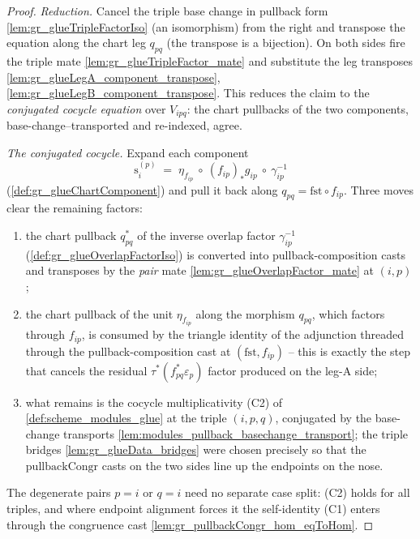 \begin{proof}
    \leanok
  \emph{Reduction.} Cancel the triple base change in pullback form
  \cref{lem:gr_glueTripleFactorIso} (an isomorphism) from the right and transpose the
  equation along the chart leg \(q_{pq}\) (the transpose is a bijection). On both sides
  fire the triple mate \cref{lem:gr_glueTripleFactor_mate} and substitute the leg
  transposes \cref{lem:gr_glueLegA_component_transpose},
  \cref{lem:gr_glueLegB_component_transpose}. This reduces the claim to the
  \emph{conjugated cocycle equation} over \(V_{ipq}\): the chart pullbacks of the two
  components, base-change--transported and re-indexed, agree.

  \emph{The conjugated cocycle.} Expand each component
  \[
    \mathrm{s}_i^{(p)}
      \;=\; \eta_{f_{ip}}\ \circ\ (f_{ip})_{*}g_{ip}\ \circ\ \gamma_{ip}^{-1}
  \]
  (\cref{def:gr_glueChartComponent}) and pull it back along \(q_{pq} = \mathrm{fst}\circ
  f_{ip}\). Three moves clear the remaining factors:
  \begin{enumerate}
    \item the chart pullback \(q_{pq}^{*}\) of the inverse overlap factor
      \(\gamma_{ip}^{-1}\) (\cref{def:gr_glueOverlapFactorIso}) is converted into
      pullback-composition casts and transposes by the \emph{pair} mate
      \cref{lem:gr_glueOverlapFactor_mate} at \((i,p)\);
    \item the chart pullback of the unit \(\eta_{f_{ip}}\) along the morphism
      \(q_{pq}\), which factors through \(f_{ip}\), is consumed by the triangle identity
      of the adjunction threaded through the pullback-composition cast at
      \((\mathrm{fst}, f_{ip})\) -- this is exactly the step that cancels the residual
      \(\tau^{*}(f_{pq}^{*}\varepsilon_p)\) factor produced on the leg-A side;
    \item what remains is the cocycle multiplicativity (C2) of
      \cref{def:scheme_modules_glue} at the triple \((i,p,q)\), conjugated by the
      base-change transports \cref{lem:modules_pullback_basechange_transport}; the
      triple bridges \cref{lem:gr_glueData_bridges} were chosen precisely so that the
      \(\mathrm{pullbackCongr}\) casts on the two sides line up the endpoints on the
      nose.
  \end{enumerate}
  The degenerate pairs \(p = i\) or \(q = i\) need no separate case split: (C2) holds for
  all triples, and where endpoint alignment forces it the self-identity (C1) enters
  through the congruence cast \cref{lem:gr_pullbackCongr_hom_eqToHom}.
\end{proof}

